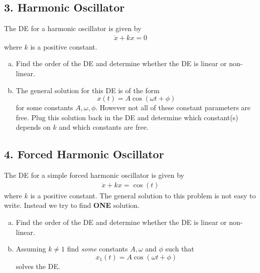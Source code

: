 \subsection*{3. Harmonic Oscillator}
The DE for a harmonic oscillator is given by
	\begin{align*}
		\ddot x + k x = 0
	\end{align*}
where $ k $ is a positive constant.
	\begin{enumerate}[a)]
	\item Find the order of the DE and determine whether the DE is linear or non-linear.
	\item	The general solution for this DE is of the form
	$$ x(t) = A \cos( \omega t + \phi) $$
for some constants $ A , \omega, \phi $. However not all of these constant parameters are free. Plug this solution back in the DE and determine which constant(s) depends on $ k $ and which constants are free.
	\end{enumerate}











\subsection*{4. Forced Harmonic Oscillator}
The DE for a simple forced harmonic oscillator is given by
	\begin{align*}
		\ddot x + k x = \cos (t)
	\end{align*}
where  $ k $ is a positive constant. The general solution to this problem is not easy to write. Instead we try to find \textbf{ONE} solution. \\


	\begin{enumerate}[a)]
	\item Find the order of the DE and determine whether the DE is linear or non-linear.
	\item	Assuming $ k \neq 1 $ find \emph{some} constants $ A, \omega $ and $ \phi $  such that $$ x _ 1(t) = A \cos( \omega t + \phi) $$ solves the DE.
	\end{enumerate}




